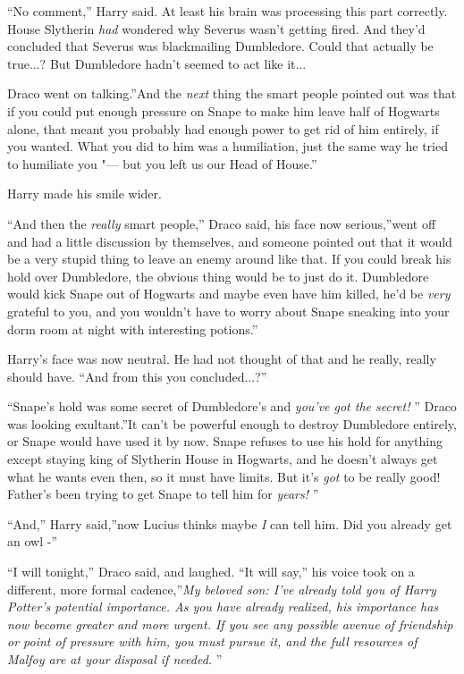 ``No comment,'' Harry said. At least his brain was processing this part
correctly. House Slytherin \emph{had} wondered why Severus wasn't
getting fired. And they'd concluded that Severus was blackmailing
Dumbledore. Could that actually be true...? But Dumbledore hadn't
seemed to act like it...

Draco went on talking.''And the \emph{next} thing the smart people
pointed out was that if you could put enough pressure on Snape to make
him leave half of Hogwarts alone, that meant you probably had enough
power to get rid of him entirely, if you wanted. What you did to him was
a humiliation, just the same way he tried to humiliate you "--- but you
left us our Head of House.''

Harry made his smile wider.

``And then the \emph{really} smart people,'' Draco said, his face now
serious,''went off and had a little discussion by themselves, and
someone pointed out that it would be a very stupid thing to leave an
enemy around like that. If you could break his hold over Dumbledore, the
obvious thing would be to just do it. Dumbledore would kick Snape out of
Hogwarts and maybe even have him killed, he'd be \emph{very} grateful to
you, and you wouldn't have to worry about Snape sneaking into your dorm
room at night with interesting potions.''

Harry's face was now neutral. He had not thought of that and he really,
really should have. ``And from this you concluded...?''

``Snape's hold was some secret of Dumbledore's and \emph{you've got the
secret!} '' Draco was looking exultant.''It can't be powerful enough to
destroy Dumbledore entirely, or Snape would have used it by now. Snape
refuses to use his hold for anything except staying king of Slytherin
House in Hogwarts, and he doesn't always get what he wants even then, so
it must have limits. But it's \emph{got} to be really good! Father's
been trying to get Snape to tell him for \emph{years!} ''

``And,'' Harry said,''now Lucius thinks maybe \emph{I} can tell him. Did
you already get an owl -''

``I will tonight,'' Draco said, and laughed. ``It will say,'' his voice
took on a different, more formal cadence,''\emph{My beloved son: I've
already told you of Harry Potter's potential importance. As you have
already realized, his importance has now become greater and more urgent.
If you see any possible avenue of friendship or point of pressure with
him, you must pursue it, and the full resources of Malfoy are at your
disposal if needed.} ''

